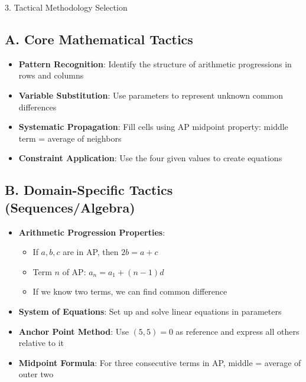 \documentclass[12pt]{article}
\begin{document}
\begin{tacticsbox}{3. Tactical Methodology Selection}

\subsection*{A. Core Mathematical Tactics}
\begin{itemize}[leftmargin=*]
    \item \textbf{Pattern Recognition}: Identify the structure of arithmetic progressions in rows and columns
    
    \item \textbf{Variable Substitution}: Use parameters to represent unknown common differences
    
    \item \textbf{Systematic Propagation}: Fill cells using AP midpoint property: middle term = average of neighbors
    
    \item \textbf{Constraint Application}: Use the four given values to create equations
\end{itemize}

\subsection*{B. Domain-Specific Tactics (Sequences/Algebra)}
\begin{itemize}[leftmargin=*]
    \item \textbf{Arithmetic Progression Properties}:
    \begin{itemize}
        \item If $a, b, c$ are in AP, then $2b = a + c$
        \item Term $n$ of AP: $a_n = a_1 + (n-1)d$
        \item If we know two terms, we can find common difference
    \end{itemize}
    
    \item \textbf{System of Equations}: Set up and solve linear equations in parameters
    
    \item \textbf{Anchor Point Method}: Use $(5,5) = 0$ as reference and express all others relative to it
    
    \item \textbf{Midpoint Formula}: For three consecutive terms in AP, middle = average of outer two
\end{itemize}


\end{tacticsbox}
\end{document}
